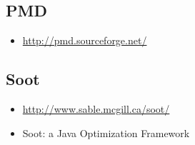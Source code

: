\subsection{PMD}
\begin{itemize}
\item \href{http://pmd.sourceforge.net/}{http://pmd.sourceforge.net/}
\end{itemize}

\subsection{Soot}
\begin{itemize}
\item \href{http://www.sable.mcgill.ca/soot/}{http://www.sable.mcgill.ca/soot/}
\item Soot: a Java Optimization Framework
\end{itemize}
